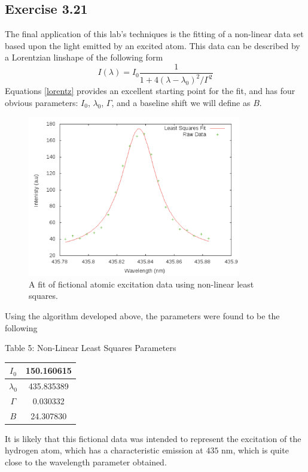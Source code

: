 \documentclass[12pt]{article}
\begin{document}
\subsection{Exercise 3.21}
The final application of this lab's techniques is the fitting of a non-linear data set based upon the light emitted by an excited atom.  This data can be described by a Lorentzian linshape of the following form
\begin{equation}
\label{lorentz}
I(\lambda) = I_0 \frac{1}{1+4(\lambda-\lambda_0)^2 /  \Gamma^2}
\end{equation}
Equations \eqref{lorentz} provides an excellent starting point for the fit, and has four obvious parameters: $I_0$, $\lambda_0$, $\Gamma$, and a baseline shift we will define as $B$.
\begin{figure}[!h]
\centering
\includegraphics[width =120 mm, height = 70mm]{Ex_3_21.pdf}
\caption{A fit of fictional atomic excitation data using non-linear least squares.}
\label{fig:3.21}
\end{figure}
Using the algorithm developed above, the parameters were found to be the following
\begin{center}
Table 5:  Non-Linear Least Squares Parameters \\
\begin{tabular}{ | c | c |}
\hline
$I_0$ &  150.160615\\ \hline
$\lambda_0$ &  435.835389 \\ \hline
$\Gamma$ &0.030332   \\ \hline
$B$ &  24.307830\\ \hline
\end{tabular}
\end{center}
It is likely that this fictional data was intended to represent the excitation of the hydrogen atom, which has a characteristic emission at $435$ nm, which is quite close to the wavelength parameter obtained.
\end{document}

